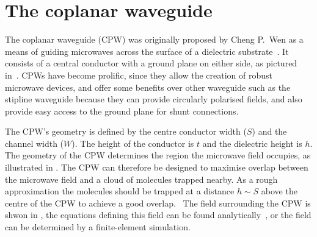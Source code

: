 
\section{The coplanar waveguide}


The coplanar waveguide (CPW) was originally proposed by Cheng P.~Wen as a
means of guiding microwaves across the surface of a dielectric
substrate~\cite{1127105}. It consists of a central conductor with a ground
plane on either side, as pictured in~. CPWs have become
prolific, since they allow the creation of robust microwave devices, and offer
some benefits over other waveguide  such as the stipline
waveguide because they can provide circularly polarised fields, and also
provide easy access to the ground plane for shunt connections.

The CPW's geometry is defined by the centre conductor width ($S$) and the
channel width ($W$). The height of the conductor is $t$ and the dielectric
height is $h$. 
The geometry of the CPW determines the region the
microwave field occupies, as illustrated in .
The CPW can therefore be designed to maximise overlap between the microwave
field and a cloud of molecules trapped nearby.  As a rough approximation the
molecules should be trapped at a distance $h\sim S$ above the centre of the CPW
to achieve a good overlap.~\cite{Boehi2009} The field surrounding the CPW is
shwon in , the equations defining this field can be
found analytically~\cite{Simons2004}, or the field can be determined by a
finite-element simulation.

